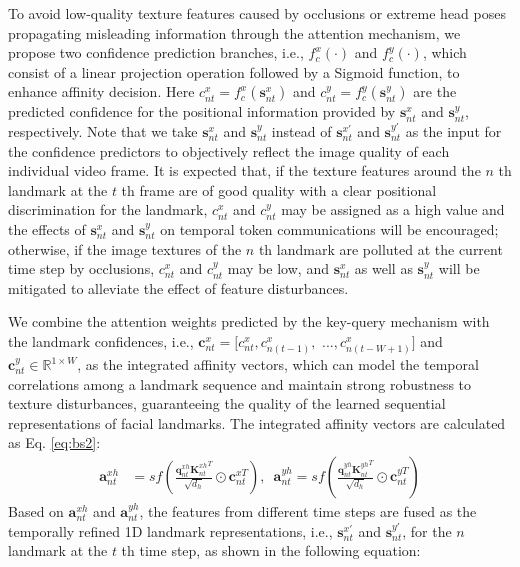 \documentclass[review]{elsarticle}
\begin{document}
To avoid low-quality texture features caused by occlusions or extreme head poses propagating misleading information through the attention mechanism, we propose two confidence prediction branches, i.e.,  $f^x_{c}(\cdot)$ and $f^y_{c}(\cdot)$, which consist of a linear projection operation followed by a Sigmoid function, to enhance affinity decision. Here $c^x_{nt} = f^x_{c}(\textbf{s}^x_{nt})$ and $c^y_{nt} = f^y_{c}(\textbf{s}^y_{nt})$ are the predicted confidence for the positional information provided by
$\textbf{s}^x_{nt}$ and $\textbf{s}^y_{nt}$, respectively. Note that we take $\textbf{s}^x_{nt}$ and $\textbf{s}^y_{nt}$ instead of $\textbf{s}^{x'}_{nt}$ and $\textbf{s}^{y'}_{nt}$ as the input for the confidence predictors to objectively reflect the image quality of each individual video frame. It is expected that, if the texture features around the $n$ th landmark at the $t$ th frame are of good quality with a clear positional discrimination for the landmark, $c^x_{nt}$ and $c^y_{nt}$ may be assigned as a high value and the effects of $\textbf{s}^x_{nt}$ and $\textbf{s}^y_{nt}$ on temporal token communications will be encouraged; otherwise, if the image textures of the $n$ th landmark are polluted at the current time step by occlusions, $c^x_{nt}$ and $c^y_{nt}$ may be low, and $\textbf{s}^x_{nt}$ as well as $\textbf{s}^y_{nt}$ will be mitigated to alleviate the effect of feature disturbances. 

We combine the attention weights predicted by the key-query mechanism with the landmark confidences, i.e., $\textbf{c}^x_{nt} = [c^x_{nt}, c^x_{n(t-1)}, $ $...,  c^x_{n(t-W+1)}]$ and $\textbf{c}^y_{nt} \in \mathbb{R}^{1\times W}$, as the integrated affinity vectors, which can model the temporal correlations among a landmark sequence and maintain strong robustness to texture disturbances, guaranteeing the quality of the learned sequential representations of facial landmarks. The integrated affinity vectors are calculated as Eq. \eqref{eq:bs2}:
\begin{equation}
	\label{eq:bs2}
	\begin{aligned}
		\textbf{a}^{xh}_{nt} & = sf(\frac{\textbf{q}^{xh}_{nt} {\textbf{K}^{xh}_{nt}}^T}{\sqrt{d_h}}\odot\textbf{c}^{xT}_{nt}),\,\,\,\textbf{a}^{yh}_{nt} = sf(\frac{\textbf{q}^{yh}_{nt} {\textbf{K}^{yh}_{nt}}^T}{\sqrt{d_h}}\odot\textbf{c}^{yT}_{nt})
	\end{aligned}
\end{equation}
Based on $\textbf{a}^{xh}_{nt}$ and $\textbf{a}^{yh}_{nt}$, the features from different time steps are fused as the temporally refined 1D landmark representations, i.e., 
$\textbf{s}^{x'}_{nt}$ and $\textbf{s}^{y'}_{nt}$, for the $n$ landmark at the $t$ th time step, as shown in the following equation:
\end{document}
